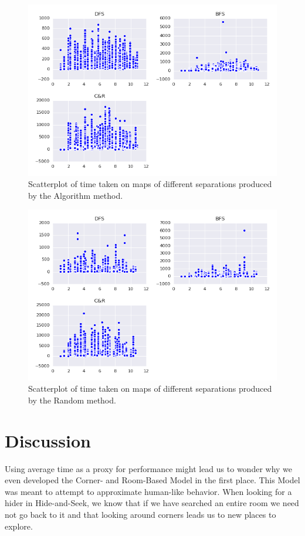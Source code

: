 \documentclass[12pt]{article}
\begin{document}
\begin{figure}[htbp]
\includegraphics[width=1\linewidth]{SepTimeAlg.png} 
\caption{Scatterplot of time taken on maps of different separations produced by the Algorithm method.}
\end{figure} 

\begin{figure}[htbp]
\includegraphics[width=1\linewidth]{SepTimeRandom.png} 
\caption{Scatterplot of time taken on maps of different separations produced by the Random method.}
\end{figure} 

\section{Discussion} \label{Discussion}
Using average time as a proxy for performance might lead us to wonder why we even developed the Corner- and Room-Based Model in the first place. This Model was meant to attempt to approximate human-like behavior. When looking for a hider in Hide-and-Seek, we know that if we have searched an entire room we need not go back to it and that looking around corners leads us to new places to explore.
\end{document}
